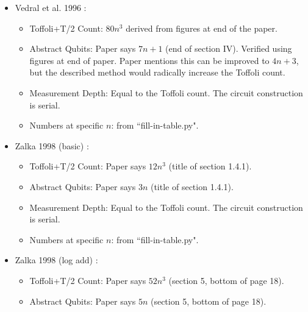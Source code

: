 \documentclass[superscriptaddress,notitlepage,longbibliography]{revtex4-1}
\theoremstyle{definition}
\theoremstyle{definition}
\begin{document}
\begin{itemize}
    \item Vedral et al. 1996 \cite{vedral1996arithmetic}:
    \begin{itemize}
        \item Toffoli+T/2 Count:
            $80n^3$ derived from figures at end of the paper.
        \item Abstract Qubits:
            Paper says $7n+1$ (end of section IV).
            Verified using figures at end of paper.
            Paper mentions this can be improved to $4n + 3$, but the described method would radically increase the Toffoli count.
        \item Measurement Depth:
            Equal to the Toffoli count.
            The circuit construction is serial.
        \item Numbers at specific $n$: from ``fill-in-table.py".
    \end{itemize}
    \item Zalka 1998 (basic) \cite{zalka1998fast}:
    \begin{itemize}
        \item Toffoli+T/2 Count:
            Paper says $12n^3$ (title of section 1.4.1).
        \item Abstract Qubits:
            Paper says $3n$ (title of section 1.4.1).
        \item Measurement Depth:
            Equal to the Toffoli count.
            The circuit construction is serial.
        \item Numbers at specific $n$: from ``fill-in-table.py".
    \end{itemize}
    \item Zalka 1998 (log add) \cite{zalka1998fast}:
    \begin{itemize}
        \item Toffoli+T/2 Count:
            Paper says $52n^3$ (section 5, bottom of page 18).
        \item Abstract Qubits:
            Paper says $5n$ (section 5, bottom of page 18).

\end{itemize}
\end{itemize}
\end{document}
